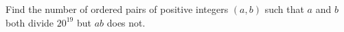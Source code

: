 Find the number of ordered pairs of positive integers $(a,b)$ such that $a$ and $b$ both divide $20^{19}$ but $ab$ does not.
